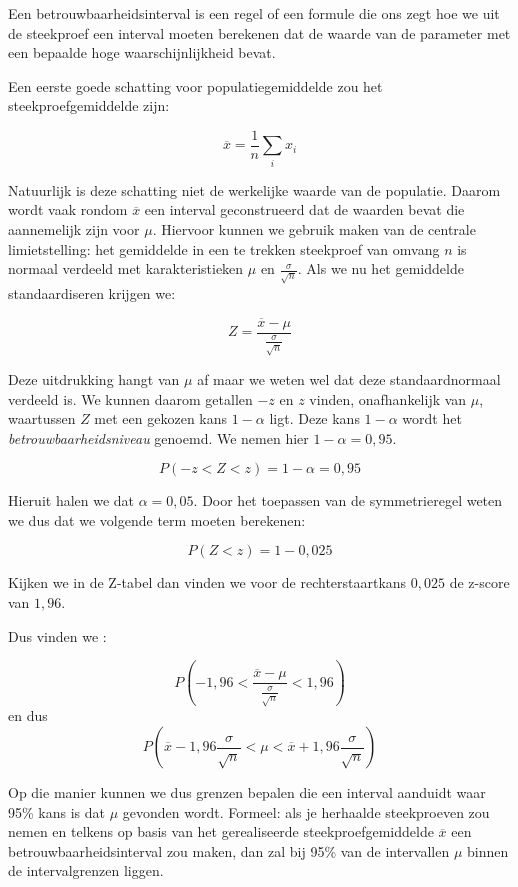 \begin{definition}[Betrouwbaarheidsinterval]
Een betrouwbaarheidsinterval is een regel of een formule die ons zegt hoe we uit de steekproef een interval moeten berekenen dat de waarde van de parameter met een bepaalde hoge waarschijnlijkheid bevat.
\end{definition}

Een eerste goede schatting voor populatiegemiddelde zou het steekproefgemiddelde zijn:

\[ \overline{x} = \frac{1}{n} \sum_{i} x_{i} \]

Natuurlijk is deze schatting niet de werkelijke waarde van de populatie. Daarom wordt vaak rondom $\overline{x}$ een interval geconstrueerd dat de waarden bevat die aannemelijk zijn voor $\mu$. Hiervoor kunnen we gebruik maken van de centrale limietstelling: het gemiddelde in een te trekken steekproef van omvang $n$ is normaal verdeeld met karakteristieken $\mu$ en $\frac{\sigma}{\sqrt{n}}$.  Als we nu het gemiddelde standaardiseren krijgen we:

\[ Z = \frac{\overline{x} - \mu}{\frac{\sigma}{\sqrt{n}}} \]

Deze uitdrukking hangt van $\mu$ af maar we weten wel dat deze standaardnormaal verdeeld is. We kunnen daarom getallen $-z$ en $z$ vinden, onafhankelijk van $\mu$, waartussen $Z$ met een gekozen kans $1 - \alpha$ ligt. Deze kans $1 - \alpha$ wordt het \emph{betrouwbaarheidsniveau} genoemd. We nemen hier $1 - \alpha= 0,95$.

\[P(-z < Z < z) = 1 - \alpha = 0,95 \]

Hieruit halen we dat $\alpha = 0,05$. Door het toepassen van de symmetrieregel weten we dus dat we volgende term moeten berekenen:

\[ P( Z < z) = 1 - 0,025 \]

Kijken we in de Z-tabel dan vinden we voor de rechterstaartkans $0,025$ de z-score van $1,96$.

Dus vinden we :

\[ P( -1,96 < \frac{\overline{x} - \mu}{\frac{\sigma}{\sqrt{n}}} < 1,96 ) \]
en dus
\[ P ( \overline{x} -1,96 \frac{\sigma}{\sqrt{n}} <\mu < \overline{x} + 1,96 \frac{\sigma}{\sqrt{n}}) \]

Op die manier kunnen we dus grenzen bepalen die een interval aanduidt waar 95\% kans is dat $\mu$ gevonden wordt. Formeel: als je herhaalde steekproeven zou nemen en telkens op basis van het gerealiseerde steekproefgemiddelde $\overline{x}$ een betrouwbaarheidsinterval zou maken, dan zal bij 95\% van de intervallen $\mu$ binnen de intervalgrenzen liggen.

